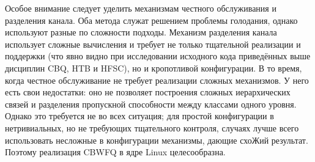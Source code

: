 	Особое внимание следует уделить механизмам честного обслуживания и
	разделения канала. Оба метода служат решением проблемы голодания,
	однако используют разные по сложности подходы. Механизм разделения канала
	использует сложные вычисления и требует не только тщательной реализации
	и поддержки (что явно видно при исследовании исходного кода
	приведённых выше дисциплин CBQ, HTB и HFSC), но и кропотливой конфигурации. 
	В то время, когда честное обслуживание не требует реализации сложных механизмов.
	У него есть свои недостатки: оно не позволяет построения сложных иерархических
	связей и разделения пропускной способности между классами одного уровня. 
	Однако это требуется не во всех ситуация; для простой конфигурации
	в нетривиальных, но не требующих тщательного контроля, случаях
	лучше всего использовать несложные в конфигурации механизмы, дающие
	схоЖий результат. Поэтому реализация CBWFQ в ядре Linux целесообразна.
